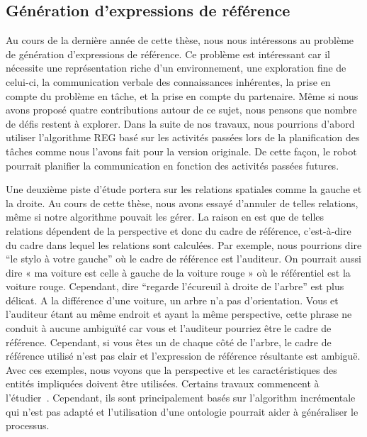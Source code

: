 \subsection*{Génération d'expressions de référence}

Au cours de la dernière année de cette thèse, nous nous intéressons au problème de génération d'expressions de référence. Ce problème est intéressant car il nécessite une représentation riche d'un environnement, une exploration fine de celui-ci, la communication verbale des connaissances inhérentes, la prise en compte du problème en tâche, et la prise en compte du partenaire. Même si nous avons proposé quatre contributions autour de ce sujet, nous pensons que nombre de défis restent à explorer. Dans la suite de nos travaux, nous pourrions d'abord utiliser l'algorithme REG basé sur les activités passées lors de la planification des tâches comme nous l'avons fait pour la version originale. De cette façon, le robot pourrait planifier la communication en fonction des activités passées futures.

Une deuxième piste d'étude portera sur les relations spatiales comme la gauche et la droite. Au cours de cette thèse, nous avons essayé d'annuler de telles relations, même si notre algorithme pouvait les gérer. La raison en est que de telles relations dépendent de la perspective et donc du cadre de référence, c'est-à-dire du cadre dans lequel les relations sont calculées. Par exemple, nous pourrions dire ``le stylo à votre gauche'' où le cadre de référence est l'auditeur. On pourrait aussi dire « ma voiture est celle à gauche de la voiture rouge » où le référentiel est la voiture rouge. Cependant, dire ``regarde l'écureuil à droite de l'arbre'' est plus délicat. A la différence d'une voiture, un arbre n'a pas d'orientation. Vous et l'auditeur étant au même endroit et ayant la même perspective, cette phrase ne conduit à aucune ambiguïté car vous et l'auditeur pourriez être le cadre de référence. Cependant, si vous êtes un de chaque côté de l'arbre, le cadre de référence utilisé n'est pas clair et l'expression de référence résultante est ambiguë. Avec ces exemples, nous voyons que la perspective et les caractéristiques des entités impliquées doivent être utilisées. Certains travaux commencent à l'étudier~\cite{kelleher_2006_incremental, dos_2015_generating}. Cependant, ils sont principalement basés sur l'algorithm incrémentale qui n'est pas adapté et l'utilisation d'une ontologie pourrait aider à généraliser le processus. 

